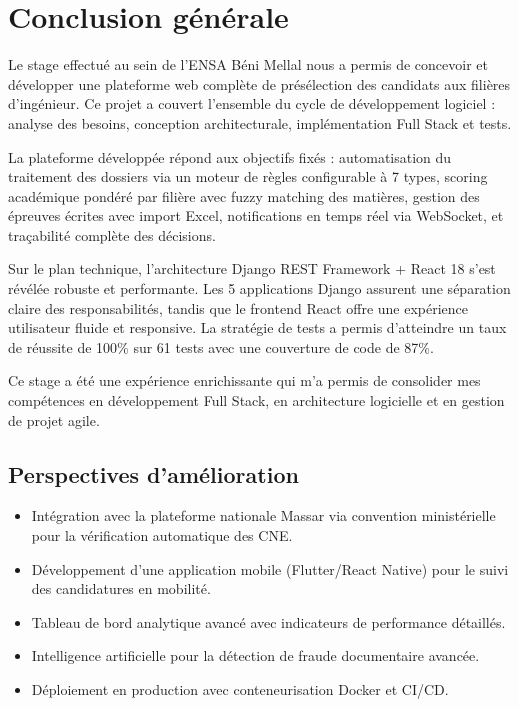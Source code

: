 \chapter*{Conclusion générale}

Le stage effectué au sein de l'ENSA Béni Mellal nous a permis de concevoir et développer une plateforme web complète de présélection des candidats aux filières d'ingénieur. Ce projet a couvert l'ensemble du cycle de développement logiciel : analyse des besoins, conception architecturale, implémentation Full Stack et tests.

La plateforme développée répond aux objectifs fixés : automatisation du traitement des dossiers via un moteur de règles configurable à 7 types, scoring académique pondéré par filière avec fuzzy matching des matières, gestion des épreuves écrites avec import Excel, notifications en temps réel via WebSocket, et traçabilité complète des décisions.

Sur le plan technique, l'architecture Django REST Framework + React 18 s'est révélée robuste et performante. Les 5 applications Django assurent une séparation claire des responsabilités, tandis que le frontend React offre une expérience utilisateur fluide et responsive. La stratégie de tests a permis d'atteindre un taux de réussite de 100\% sur 61 tests avec une couverture de code de 87\%.

Ce stage a été une expérience enrichissante qui m'a permis de consolider mes compétences en développement Full Stack, en architecture logicielle et en gestion de projet agile.

\section*{Perspectives d'amélioration}

\begin{itemize}[leftmargin=2cm]
  \item Intégration avec la plateforme nationale Massar via convention ministérielle pour la vérification automatique des CNE.
  \item Développement d'une application mobile (Flutter/React Native) pour le suivi des candidatures en mobilité.
  \item Tableau de bord analytique avancé avec indicateurs de performance détaillés.
  \item Intelligence artificielle pour la détection de fraude documentaire avancée.
  \item Déploiement en production avec conteneurisation Docker et CI/CD.
\end{itemize}
